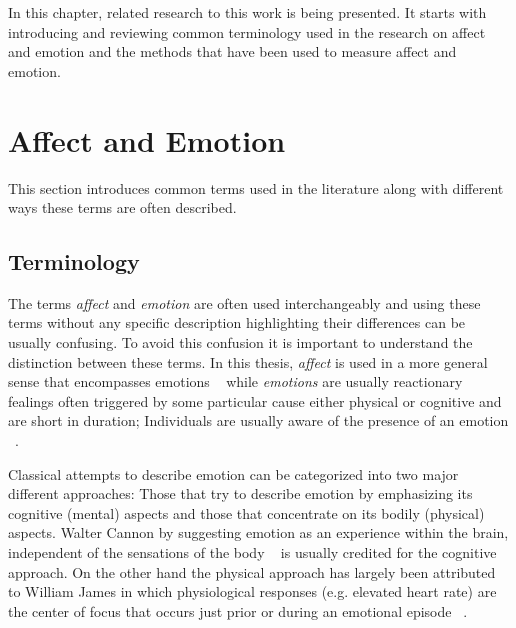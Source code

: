 

In this chapter, related research to this work is being presented. It starts with introducing and reviewing common terminology used in the research on affect and emotion and the methods that have been used to measure affect and emotion.

\section{Affect and Emotion}

This section introduces common terms used in the literature along with different ways these terms are often described.

\subsection{Terminology}

The terms \textit{affect} and \textit{emotion} are often used interchangeably and using these terms without any specific description highlighting their differences can be usually confusing. To avoid this confusion it is important to understand the distinction between these terms. In this thesis, \textit{affect} is used in a more general sense that encompasses emotions ~\cite{forgas1995mood} while \textit{emotions} are usually reactionary fealings often triggered by some particular cause either physical or cognitive and are short in duration; Individuals are usually aware of the presence of an emotion ~\cite{paiva2007affective}.

Classical attempts to describe emotion can be categorized into two major different approaches: Those that try to describe emotion by emphasizing its cognitive (mental) aspects and those that concentrate on its bodily (physical) aspects. Walter Cannon by suggesting emotion as an experience within the brain, independent of the sensations of the body ~\cite{cannon1927james} is usually credited for the cognitive approach. On the other hand the physical approach has largely been attributed to William James in which physiological responses (e.g. elevated heart rate) are the center of focus that occurs just prior or during an emotional episode ~\cite{paiva2007affective}.

